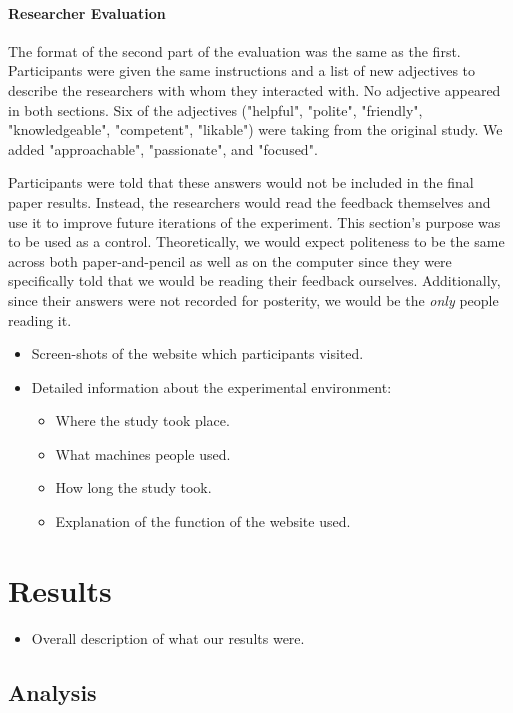 \documentclass{sig-alternate-05-2015}
\begin{document}
{\paragraph{Researcher Evaluation}
The format of the second part of the evaluation was the same as the first. Participants were given the same instructions  and a list of new adjectives to describe the researchers with whom they interacted with.  No adjective appeared in both sections.  Six of the adjectives ("helpful", "polite", "friendly", "knowledgeable", "competent", "likable") were taking from the original study. We added "approachable", "passionate", and "focused".

Participants were told that these answers would not be included in the final paper results.  Instead, the researchers would read the feedback themselves and use it to improve future iterations of the experiment.  This section's purpose was to be used as a control.  Theoretically, we would expect politeness to be the same across both paper-and-pencil as well as on the computer since they were specifically told that we would be reading their feedback ourselves.  Additionally, since their answers were not recorded for posterity, we would be the \textit{only} people reading it.

\begin{itemize}
    \item Screen-shots of the website which participants visited.
    \item Detailed information about the experimental environment: 
    \begin{itemize}
        \item Where the study took place.
        \item What machines people used.
        \item How long the study took.
        \item Explanation of the function of the website used.
    \end{itemize}
\end{itemize}
 
\section{Results}

\begin{itemize}
    \item Overall description of what our results were.
\end{itemize}

\subsection{Analysis}

}
\end{document}
